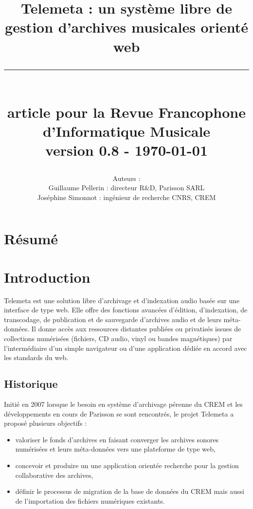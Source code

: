 \documentclass[a4paper,11pt,french]{article}
\author{Auteurs : \\
\vspace{0.5cm}
Guillaume Pellerin : directeur R$\&$D, Parisson SARL\\
Joséphine Simonnot : ingénieur de recherche CNRS, CREM\\}
\title{
\huge{\bf{Telemeta : un système libre de gestion d'archives musicales orienté web}}\\
\rule{15cm}{0.5mm}\\
\vspace{0.5cm}
\large{article pour la Revue Francophone d'Informatique Musicale}\\
version 0.8 - \today \\
\vspace{0.5cm}
}
\begin{document}
\renewcommand{\labelitemi}{$\bullet$}

\maketitle

\tableofcontents
\newpage

\section*{Résumé}


\section{Introduction}

Telemeta est une solution libre d'archivage et d'indexation audio basée sur une interface de type web. Elle offre des fonctions avancées d'édition, d'indexation, de transcodage, de publication et de sauvegarde d'archives audio et de leurs méta-données. Il donne accès aux ressources distantes publiées ou privatisés issues de collections numérisées (fichiers, CD audio, vinyl ou bandes magnétiques) par l'intermédiaire d'un simple navigateur ou d'une application dédiée en accord avec les standards du web.\\

\subsection{Historique}

Initié en 2007 lorsque le besoin en système d'archivage pérenne du CREM et les développements en cours de Parisson se sont rencontrés, le projet Telemeta a proposé plusieurs objectifs :\\

\begin{itemize}
\item valoriser le fonds d'archives en faisant converger les archives sonores numérisées et leurs méta-données vers une plateforme de type web, \\
\item concevoir et produire un une application orientée recherche pour la gestion collaborative des archives, \\
\item définir le processus de migration de la base de données du CREM mais aussi de l'importation des fichiers numériques existants. \\
\end{itemize}
\end{document}

